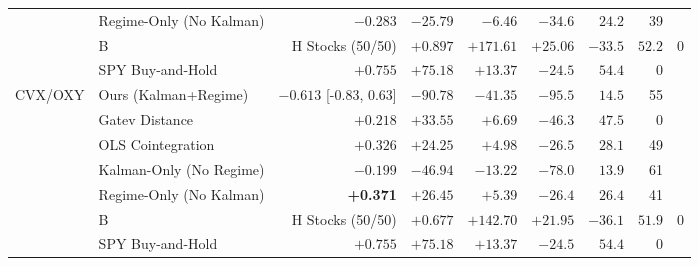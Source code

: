 \begin{table}[t]
\begin{tabular}{ll rrrrrr}
 & Regime-Only (No Kalman) & $-0.283$ & $-25.79$ & $-6.46$ & $-34.6$ & $24.2$ & 39 \\
 & B&H Stocks (50/50) & $+0.897$ & $+171.61$ & $+25.06$ & $-33.5$ & $52.2$ & 0 \\
 & SPY Buy-and-Hold & $+0.755$ & $+75.18$ & $+13.37$ & $-24.5$ & $54.4$ & 0 \\
\midrule
CVX/OXY & Ours (Kalman+Regime) & $-0.613$ [-0.83, 0.63] & $-90.78$ & $-41.35$ & $-95.5$ & $14.5$ & 55 \\
 & Gatev Distance & $+0.218$ & $+33.55$ & $+6.69$ & $-46.3$ & $47.5$ & 0 \\
 & OLS Cointegration & $+0.326$ & $+24.25$ & $+4.98$ & $-26.5$ & $28.1$ & 49 \\
 & Kalman-Only (No Regime) & $-0.199$ & $-46.94$ & $-13.22$ & $-78.0$ & $13.9$ & 61 \\
 & Regime-Only (No Kalman) & \textbf{+0.371} & $+26.45$ & $+5.39$ & $-26.4$ & $26.4$ & 41 \\
 & B&H Stocks (50/50) & $+0.677$ & $+142.70$ & $+21.95$ & $-36.1$ & $51.9$ & 0 \\
 & SPY Buy-and-Hold & $+0.755$ & $+75.18$ & $+13.37$ & $-24.5$ & $54.4$ & 0 \\
\bottomrule
\end{tabular}
\end{table}
